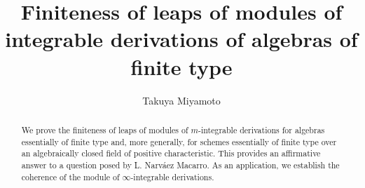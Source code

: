 \documentclass{amsart}
\title{Finiteness of leaps of modules of integrable derivations of algebras of finite type}
\author{Takuya Miyamoto}
\begin{document}

\maketitle

\begin{abstract}
We prove the finiteness of leaps of modules of $m$-integrable derivations for algebras essentially of finite type and, more generally, for schemes essentially of finite type over an algebraically closed field of positive characteristic. This provides an affirmative answer to a question posed by L. {Narváez Macarro}. As an application, we establish the coherence of the module of $\infty$-integrable derivations.
\end{abstract}

\tableofcontents


\newtheorem{theorem}{Theorem}[section]
\newtheorem{proposition}[theorem]{Proposition}
\newtheorem{corollary}[theorem]{Corollary}
\newtheorem{lemma}[theorem]{Lemma}
\theoremstyle{definition}
\newtheorem{definition}[theorem]{Definition}

\newtheorem{assumption}[theorem]{Assumption}
\newtheorem{setting}[theorem]{Setting}
\newtheorem{deflemma}[section]{Definition-Lemma}
\theoremstyle{remark}
\newtheorem{remark}{Remark}[theorem]
\newtheorem{example}{Example}[theorem]
\theoremstyle{definition}
\end{document}
